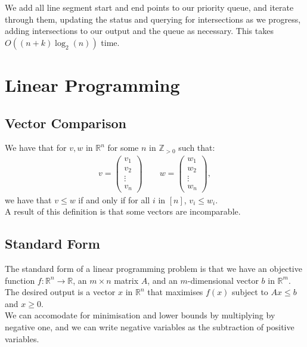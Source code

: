 \documentclass[a4paper, 12pt, twoside]{article}
\begin{document}
We add all line segment start and end points to our priority queue, and
iterate through them, updating the status and querying for intersections as
we progress, adding intersections to our output and the queue as necessary.
This takes \newline $O((n + k)\log_2(n))$ time.

\section{Linear Programming}

\subsection{Vector Comparison}

We have that for $v, w$ in $\mathbb{R}^n$ for some $n$ in $\mathbb{Z}_{>0}$ such that: 
\begin{gather*}
  v = \begin{pmatrix}
    v_1 \\ v_2 \\ \vdots \\ v_n
  \end{pmatrix} \qquad
  w = \begin{pmatrix}
    w_1 \\ w_2 \\ \vdots \\ w_n
  \end{pmatrix},
\end{gather*} we have that $v \leq w$ if and only if for all $i$ in $[n]$, $v_i \leq w_i$.
\\[\baselineskip]
A result of this definition is that some vectors are incomparable.

\subsection{Standard Form}

The standard form of a linear programming problem is that we have an objective function
$f : \mathbb{R}^n \to \mathbb{R}$, an $m \times n$ matrix $A$, and an $m$-dimensional
vector $b$ in $\mathbb{R}^m$. The desired output is a vector $x$ in $\mathbb{R}^n$ that 
maximises $f(x)$ subject to $Ax \leq b$ and $x \geq 0$.
\\[\baselineskip]
We can accomodate for minimisation and lower bounds by multiplying by negative one, and
we can write negative variables as the subtraction of positive variables.
\end{document}
